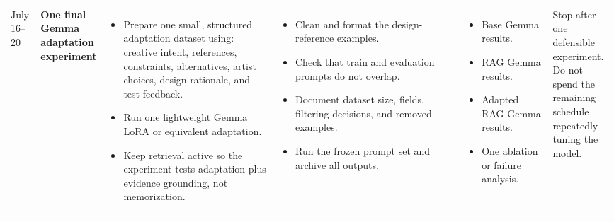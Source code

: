 \documentclass{article}
\begin{document}
\begin{landscape}
\begin{longtable}{
    L{0.05\linewidth}
    L{0.08\linewidth}
    L{0.3\linewidth}
    L{0.33\linewidth}
    L{0.15\linewidth}
    L{0.08\linewidth}
}
July 16--20
&
\textbf{One final Gemma adaptation experiment}
&
\begin{itemize}[leftmargin=*,nosep]
    \item Prepare one small, structured adaptation dataset using:
    creative intent, references, constraints, alternatives,
    artist choices, design rationale, and test feedback.
    \item Run one lightweight Gemma LoRA or equivalent adaptation.
    \item Keep retrieval active so the experiment tests
    adaptation plus evidence grounding, not memorization.
\end{itemize}
&
\begin{itemize}[leftmargin=*,nosep]
    \item Clean and format the design-reference examples.
    \item Check that train and evaluation prompts do not overlap.
    \item Document dataset size, fields, filtering decisions,
    and removed examples.
    \item Run the frozen prompt set and archive all outputs.
\end{itemize}
&
\begin{itemize}[leftmargin=*,nosep]
    \item Base Gemma results.
    \item RAG Gemma results.
    \item Adapted RAG Gemma results.
    \item One ablation or failure analysis.
\end{itemize}
&
Stop after one defensible experiment.
Do not spend the remaining schedule repeatedly tuning the model.
\\


\end{longtable}
\end{landscape}
\end{document}
